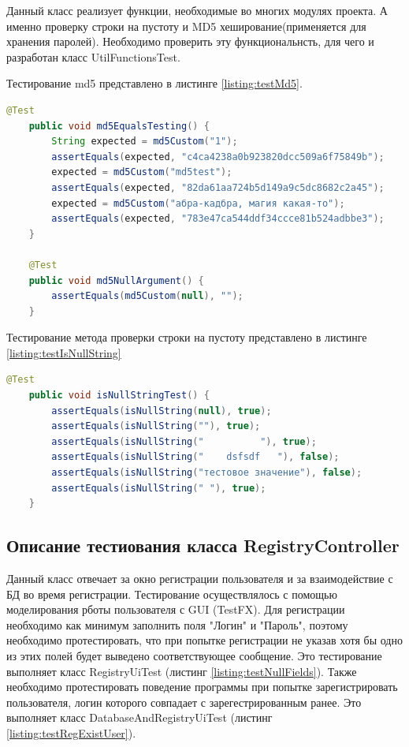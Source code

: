 \documentclass[a4paper,12pt]{article}
\begin{document}
Данный класс реализует функции, необходимые во многих модулях проекта. А именно проверку строки на пустоту и MD5 хеширование(применяется для хранения паролей). Необходимо проверить эту функциональнсть, для чего и разработан класс UtilFunctionsTest.
\par Тестирование md5 представлено в листинге \ref{listing:testMd5}.

\begin{lstlisting}[language=java, caption=тестирование md5 , label=listing:testMd5]
    @Test
    public void md5EqualsTesting() {
        String expected = md5Custom("1");
        assertEquals(expected, "c4ca4238a0b923820dcc509a6f75849b");
        expected = md5Custom("md5test");
        assertEquals(expected, "82da61aa724b5d149a9c5dc8682c2a45");
        expected = md5Custom("абра-кадбра, магия какая-то");
        assertEquals(expected, "783e47ca544ddf34ccce81b524adbbe3");
    }

    @Test
    public void md5NullArgument() {
        assertEquals(md5Custom(null), "");
    }

\end{lstlisting}


Тестирование метода проверки строки на пустоту представлено в листинге \ref{listing:testIsNullString}

\begin{lstlisting}[language=java, caption=тестирование isNullString, label=listing:testIsNullString]
    @Test
    public void isNullStringTest() {
        assertEquals(isNullString(null), true);
        assertEquals(isNullString(""), true);
        assertEquals(isNullString("          "), true);
        assertEquals(isNullString("    dsfsdf   "), false);
        assertEquals(isNullString("тестовое значение"), false);
        assertEquals(isNullString(" "), true);
    }
\end{lstlisting}

\subsection{Описание тестиования класса RegistryController}
Данный класс отвечает за окно регистрации пользователя и за взаимодействие с БД во время регистрации.
Тестирование осуществлялось с помощью моделирования рботы пользователя с GUI (TestFX). Для регистрации необходимо как минимум заполнить поля "Логин" и "Пароль", поэтому необходимо протестировать, что при попытке регистрации не указав хотя бы одно из этих полей будет выведено соответствующее сообщение. Это тестирование выполняет класс RegistryUiTest (листинг \ref{listing:testNullFields}). Также необходимо протестировать поведение программы при попытке зарегистрировать пользователя, логин которого совпадает с зарегестрированным ранее. Это выполняет класс DatabaseAndRegistryUiTest (листинг \ref{listing:testRegExistUser}).
\end{document}
